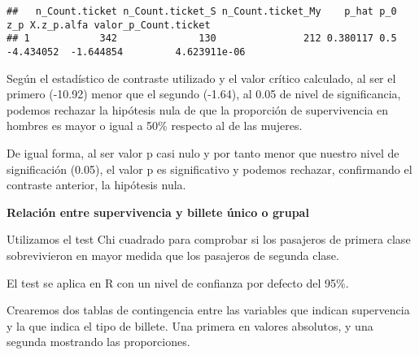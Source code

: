 \documentclass[
]{article}
\newenvironment{Shaded}{\begin{snugshade}}{\end{snugshade}}
\newcommand{\CommentTok}[1]{\textcolor[rgb]{0.50,0.62,0.50}{#1}}
\newcommand{\DataTypeTok}[1]{\textcolor[rgb]{0.87,0.87,0.75}{#1}}
\newcommand{\DecValTok}[1]{\textcolor[rgb]{0.86,0.86,0.80}{#1}}
\newcommand{\KeywordTok}[1]{\textcolor[rgb]{0.94,0.87,0.69}{#1}}
\newcommand{\NormalTok}[1]{\textcolor[rgb]{0.80,0.80,0.80}{#1}}
\newcommand{\OperatorTok}[1]{\textcolor[rgb]{0.94,0.94,0.82}{#1}}
\newcommand{\StringTok}[1]{\textcolor[rgb]{0.80,0.58,0.58}{#1}}
\begin{document}
\begin{verbatim}
##   n_Count.ticket n_Count.ticket_S n_Count.ticket_My    p_hat p_0       z_p X.z_p.alfa valor_p_Count.ticket
## 1            342              130               212 0.380117 0.5 -4.434052  -1.644854         4.623911e-06
\end{verbatim}

Según el estadístico de contraste utilizado y el valor crítico
calculado, al ser el primero (-10.92) menor que el segundo (-1.64), al
0.05 de nivel de significancia, podemos rechazar la hipótesis nula de
que la proporción de supervivencia en hombres es mayor o igual a 50\%
respecto al de las mujeres.

De igual forma, al ser valor p casi nulo y por tanto menor que nuestro
nivel de significación (0.05), el valor p es significativo y podemos
rechazar, confirmando el contraste anterior, la hipótesis nula.

\textbf{Relación entre supervivencia y billete único o grupal}

Utilizamos el test Chi cuadrado para comprobar si los pasajeros de
primera clase sobrevivieron en mayor medida que los pasajeros de segunda
clase.

El test se aplica en R con un nivel de confianza por defecto del 95\%.

Crearemos dos tablas de contingencia entre las variables que indican
supervencia y la que indica el tipo de billete. Una primera en valores
absolutos, y una segunda mostrando las proporciones.

\begin{Shaded}
\end{Shaded}
\end{document}
